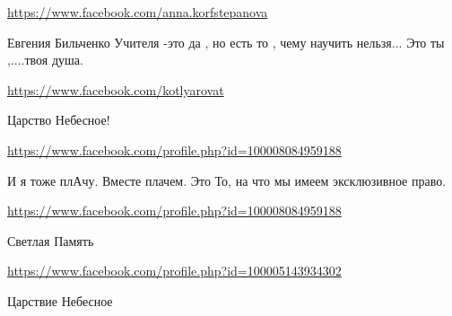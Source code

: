 \documentclass[a4paper,11pt]{extreport}
\begin{document}
\begin{itemize}
\begin{itemize}
\url{https://www.facebook.com/anna.korfstepanova}

Евгения Бильченко
Учителя -это да , но есть то , чему научить нельзя...
Это ты ,....твоя душа.

\end{itemize}
\url{https://www.facebook.com/kotlyarovat}

Царство Небесное!🙏

\url{https://www.facebook.com/profile.php?id=100008084959188}

И я тоже плАчу. Вместе плачем. Это
То, на что мы имеем эксклюзивное право.

\url{https://www.facebook.com/profile.php?id=100008084959188}

Светлая Память

\url{https://www.facebook.com/profile.php?id=100005143934302}

Царствие Небесное

\end{itemize}
\end{document}
